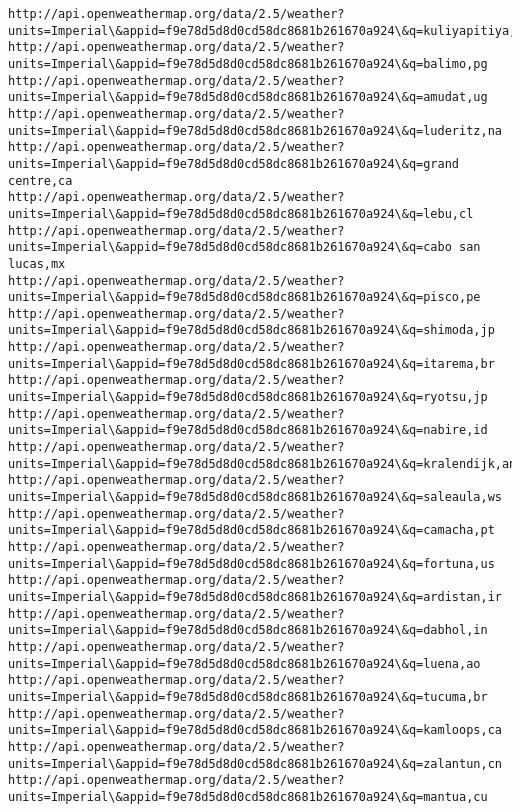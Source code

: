 \documentclass[11pt]{article}
\begin{document}
\begin{Verbatim}[commandchars=\\\{\}]
http://api.openweathermap.org/data/2.5/weather?units=Imperial\&appid=f9e78d5d8d0cd58dc8681b261670a924\&q=kuliyapitiya,lk
http://api.openweathermap.org/data/2.5/weather?units=Imperial\&appid=f9e78d5d8d0cd58dc8681b261670a924\&q=balimo,pg
http://api.openweathermap.org/data/2.5/weather?units=Imperial\&appid=f9e78d5d8d0cd58dc8681b261670a924\&q=amudat,ug
http://api.openweathermap.org/data/2.5/weather?units=Imperial\&appid=f9e78d5d8d0cd58dc8681b261670a924\&q=luderitz,na
http://api.openweathermap.org/data/2.5/weather?units=Imperial\&appid=f9e78d5d8d0cd58dc8681b261670a924\&q=grand centre,ca
http://api.openweathermap.org/data/2.5/weather?units=Imperial\&appid=f9e78d5d8d0cd58dc8681b261670a924\&q=lebu,cl
http://api.openweathermap.org/data/2.5/weather?units=Imperial\&appid=f9e78d5d8d0cd58dc8681b261670a924\&q=cabo san lucas,mx
http://api.openweathermap.org/data/2.5/weather?units=Imperial\&appid=f9e78d5d8d0cd58dc8681b261670a924\&q=pisco,pe
http://api.openweathermap.org/data/2.5/weather?units=Imperial\&appid=f9e78d5d8d0cd58dc8681b261670a924\&q=shimoda,jp
http://api.openweathermap.org/data/2.5/weather?units=Imperial\&appid=f9e78d5d8d0cd58dc8681b261670a924\&q=itarema,br
http://api.openweathermap.org/data/2.5/weather?units=Imperial\&appid=f9e78d5d8d0cd58dc8681b261670a924\&q=ryotsu,jp
http://api.openweathermap.org/data/2.5/weather?units=Imperial\&appid=f9e78d5d8d0cd58dc8681b261670a924\&q=nabire,id
http://api.openweathermap.org/data/2.5/weather?units=Imperial\&appid=f9e78d5d8d0cd58dc8681b261670a924\&q=kralendijk,an
http://api.openweathermap.org/data/2.5/weather?units=Imperial\&appid=f9e78d5d8d0cd58dc8681b261670a924\&q=saleaula,ws
http://api.openweathermap.org/data/2.5/weather?units=Imperial\&appid=f9e78d5d8d0cd58dc8681b261670a924\&q=camacha,pt
http://api.openweathermap.org/data/2.5/weather?units=Imperial\&appid=f9e78d5d8d0cd58dc8681b261670a924\&q=fortuna,us
http://api.openweathermap.org/data/2.5/weather?units=Imperial\&appid=f9e78d5d8d0cd58dc8681b261670a924\&q=ardistan,ir
http://api.openweathermap.org/data/2.5/weather?units=Imperial\&appid=f9e78d5d8d0cd58dc8681b261670a924\&q=dabhol,in
http://api.openweathermap.org/data/2.5/weather?units=Imperial\&appid=f9e78d5d8d0cd58dc8681b261670a924\&q=luena,ao
http://api.openweathermap.org/data/2.5/weather?units=Imperial\&appid=f9e78d5d8d0cd58dc8681b261670a924\&q=tucuma,br
http://api.openweathermap.org/data/2.5/weather?units=Imperial\&appid=f9e78d5d8d0cd58dc8681b261670a924\&q=kamloops,ca
http://api.openweathermap.org/data/2.5/weather?units=Imperial\&appid=f9e78d5d8d0cd58dc8681b261670a924\&q=zalantun,cn
http://api.openweathermap.org/data/2.5/weather?units=Imperial\&appid=f9e78d5d8d0cd58dc8681b261670a924\&q=mantua,cu

\end{Verbatim}
\end{document}
